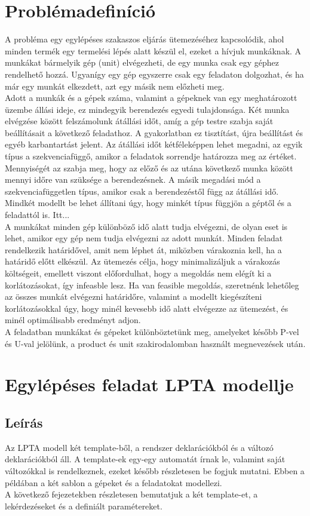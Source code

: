 \documentclass {report}
\begin{document}
\chapter{Problémadefiníció}
A probléma egy egylépéses szakaszos eljárás ütemezéséhez kapcsolódik, ahol minden termék egy termelési lépés alatt készül el, ezeket a hívjuk munkáknak. A munkákat bármelyik gép (unit) elvégezheti, de egy munka csak egy géphez rendelhető hozzá. Ugyanígy egy gép egyszerre csak egy feladaton dolgozhat, és ha már egy munkát elkezdett, azt egy másik nem előzheti meg. \\
Adott a munkák és a gépek száma, valamint a gépeknek van egy meghatározott üzembe állási ideje, ez mindegyik berendezés egyedi tulajdonsága. Két munka elvégzése között felszámolunk átállási időt, amíg a gép testre szabja saját beállításait a következő feladathoz. A gyakorlatban ez tisztítást, újra beállítást és egyéb karbantartást jelent. Az átállási időt kétféleképpen lehet megadni, az egyik típus a szekvenciafüggő, amikor a feladatok sorrendje határozza meg az értéket. Mennyiségét az szabja meg, hogy az előző és az utána következő munka között mennyi időre van szüksége a berendezésnek. A másik megadási mód a szekvenciafüggetlen típus, amikor csak a berendezéstől függ az átállási idő. Mindkét modellt be lehet állítani úgy, hogy minkét típus függjön a géptől és a feladattól is. Itt... \\
A munkákat minden gép különböző idő alatt tudja elvégezni, de olyan eset is lehet, amikor egy gép nem tudja elvégezni az adott munkát. Minden feladat rendelkezik határidővel, amit nem léphet át, miközben várakoznia kell, ha a határidő előtt elkészül. Az ütemezés célja, hogy minimalizáljuk a várakozás költségeit, emellett viszont előfordulhat, hogy a megoldás nem elégít ki a korlátozásokat, így infeasble lesz. Ha van feasible megoldás, szeretnénk lehetőleg az összes munkát elvégezni határidőre, valamint a modellt kiegészíteni korlátozásokkal úgy, hogy minél kevesebb idő alatt elvégezze az ütemezést, és minél optimálisabb eredményt adjon.  \\
A feladatban munkákat és gépeket különböztetünk meg, amelyeket később P-vel és U-val jelölünk, a product és unit szakirodalomban használt megnevezések után.

  

\chapter{Egylépéses feladat LPTA modellje}
    \section{Leírás}
    Az LPTA modell két template-ből, a rendszer deklarációkból és a változó deklarációkból áll. A template-ek egy-egy automatát írnak le, valamint saját változókkal is rendelkeznek, ezeket később részletesen be fogjuk mutatni. Ebben a példában a két sablon a gépeket és a feladatokat modellezi.\\
    A következő fejezetekben részletesen bemutatjuk a két template-et, a lekérdezéseket és a definiált paramétereket.
\end{document}
